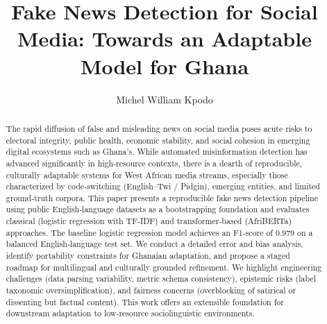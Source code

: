 \documentclass[runningheads]{llncs}
\title{Fake News Detection for Social Media: Towards an Adaptable Model for Ghana}
\author{Michel William Kpodo}
\institute{University of Ghana, Legon. \\ \email{wmakpodo@st.ug.edu.gh}}
\begin{document}
\maketitle

\begin{abstract}
The rapid diffusion of false and misleading news on social media poses acute risks to electoral integrity, public health, economic stability, and social cohesion in emerging digital ecosystems such as Ghana’s. While automated misinformation detection has advanced significantly in high‑resource contexts, there is a dearth of reproducible, culturally adaptable systems for West African media streams, especially those characterized by code‑switching (English–Twi / Pidgin), emerging entities, and limited ground‑truth corpora. This paper presents a reproducible fake news detection pipeline using public English‑language datasets as a bootstrapping foundation and evaluates classical (logistic regression with TF‑IDF) and transformer‑based (AfriBERTa) approaches. The baseline logistic regression model achieves an F1‑score of 0.979 on a balanced English‑language test set. We conduct a detailed error and bias analysis, identify portability constraints for Ghanaian adaptation, and propose a staged roadmap for multilingual and culturally grounded refinement. We highlight engineering challenges (data parsing variability, metric schema consistency), epistemic risks (label taxonomic oversimplification), and fairness concerns (overblocking of satirical or dissenting but factual content). This work offers an extensible foundation for downstream adaptation to low‑resource sociolinguistic environments.
\end{abstract}
\end{document}
